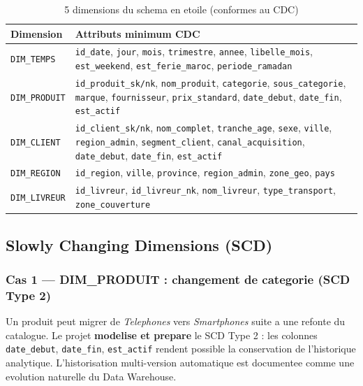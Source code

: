 \documentclass[12pt,a4paper]{article}
\begin{document}
\begin{table}[H]
\centering
\begin{tabular}{p{3cm} p{11cm}}
\toprule
\textbf{Dimension} & \textbf{Attributs minimum CDC}\\
\midrule
\texttt{DIM\_TEMPS} & \texttt{id\_date}, \texttt{jour}, \texttt{mois}, \texttt{trimestre},
  \texttt{annee}, \texttt{libelle\_mois}, \texttt{est\_weekend},
  \texttt{est\_ferie\_maroc}, \texttt{periode\_ramadan}\\[0.2cm]
\texttt{DIM\_PRODUIT} & \texttt{id\_produit\_sk/nk}, \texttt{nom\_produit}, \texttt{categorie},
  \texttt{sous\_categorie}, \texttt{marque}, \texttt{fournisseur},
  \texttt{prix\_standard}, \texttt{date\_debut}, \texttt{date\_fin}, \texttt{est\_actif}\\[0.2cm]
\texttt{DIM\_CLIENT} & \texttt{id\_client\_sk/nk}, \texttt{nom\_complet}, \texttt{tranche\_age},
  \texttt{sexe}, \texttt{ville}, \texttt{region\_admin},
  \texttt{segment\_client}, \texttt{canal\_acquisition},
  \texttt{date\_debut}, \texttt{date\_fin}, \texttt{est\_actif}\\[0.2cm]
\texttt{DIM\_REGION} & \texttt{id\_region}, \texttt{ville}, \texttt{province},
  \texttt{region\_admin}, \texttt{zone\_geo}, \texttt{pays}\\[0.2cm]
\texttt{DIM\_LIVREUR} & \texttt{id\_livreur}, \texttt{id\_livreur\_nk},
  \texttt{nom\_livreur}, \texttt{type\_transport}, \texttt{zone\_couverture}\\
\bottomrule
\end{tabular}
\caption{5 dimensions du schema en etoile (conformes au CDC)}
\end{table}

\subsection{Slowly Changing Dimensions (SCD)}

\subsubsection{Cas 1 --- DIM\_PRODUIT : changement de categorie (SCD Type 2)}

Un produit peut migrer de \textit{Telephones} vers \textit{Smartphones} suite a une refonte du
catalogue. Le projet \textbf{modelise et prepare} le SCD Type 2 : les colonnes
\texttt{date\_debut}, \texttt{date\_fin}, \texttt{est\_actif} rendent possible la conservation
de l'historique analytique. L'historisation multi-version automatique est documentee comme
une evolution naturelle du Data Warehouse.
\end{document}
